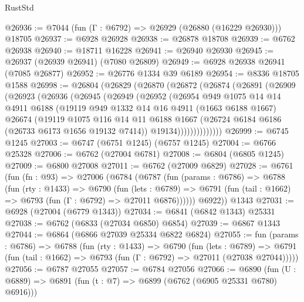 \begin{lexlean}{RustStd}
\begin{coremodule}
@26936 := @7044 (fun (Γ : @6792) => @26929 (@26880 (@16229 @26930))) @18705
@26937 := @6928 @26928
@26938 := @26878 @18708
@26939 := @6762 @26938
@26940 := @18711 @16228
@26941 := @26940 @26930
@26945 := @26937 (@26939 @26941) (@7080 @26809)
@26949 := @6928 @26938 @26941 (@7085 @26877)
@26952 := @26776 @1334 @39 @6189
@26954 := @8336 @18705 @1588
@26998 := @26804
    (@26829
      (@26870
        (@26872
          (@26874
            (@26891
              (@26909
                (@26923
                  (@26936
                    (@26945
                      (@26949
                        (@26952
                          (@26954
                            @949
                            @1075
                            @14
                            @14
                            @4911
                            @6188
                            (@19119
                              @949
                              @1332
                              @14
                              @16
                              @4911
                              (@1663 @6188 @1667)
                              @26674
                              (@19119
                                @1075
                                @116
                                @14
                                @11
                                @6188
                                @1667
                                (@26724 @6184 @6186 (@26733 @6173 @1656 @19132 @7414))
                                @19134))))))))))))))
@26999 := @6745 @1245
@27003 := @6747 (@6751 @1245) (@6757 @1245)
@27004 := @6766 @25328
@27006 := @6762 (@27004 @6781)
@27008 := @6804 (@6805 @1245)
@27009 := @6800 @27008
@27011 := @6762 (@27009 @6829)
@27028 := @6761
    (fun (fn : @93) =>
    @27006
      (@6784
        (@6787
          (fun (params : @6786) =>
          @6788
            (fun (rty : @1433) =>
            @6790
              (fun (lets : @6789) =>
              @6791 (fun (tail : @1662) => @6793 (fun (Γ : @6792) => @27011 @6876))))))
        @6922))
    @1343
@27031 := @6928 (@27004 (@6779 @1343))
@27034 := @6841 (@6842 @1343) @25331
@27038 := @6762 (@6833 (@27034 @6850) @6854)
@27039 := @6867 @1343
@27044 := @6864 (@6866 @27039 @25334 @6822 @6824)
@27055 := fun (params : @6786) =>
  @6788
    (fun (rty : @1433) =>
    @6790
      (fun (lets : @6789) =>
      @6791 (fun (tail : @1662) => @6793 (fun (Γ : @6792) => @27011 (@27038 @27044)))))
@27056 := @6787 @27055
@27057 := @6784 @27056
@27066 := @6890
    (fun (U : @6889) => @6891 (fun (t : @7) => @6899 (@6762 (@6905 @25331 @6780) @6916)))

\end{coremodule}
\end{lexlean}
